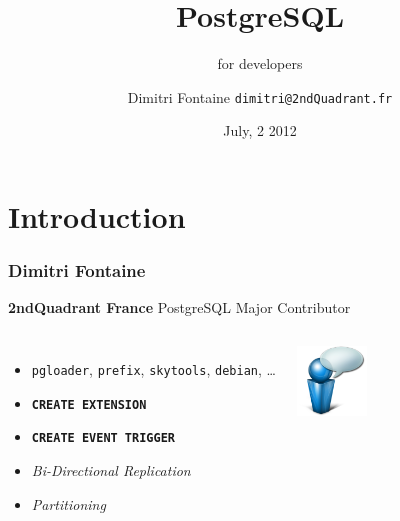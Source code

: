 \documentclass{beamer}
\title{PostgreSQL}
\subtitle{for developers}
\author{Dimitri Fontaine \texttt{dimitri@2ndQuadrant.fr}}
\date{July, 2 2012}
\begin{document}
\frame{\titlepage}

\section{Introduction}

\begin{frame}[fragile]
  \frametitle{Dimitri Fontaine}

  \begin{center}
    \textbf{2ndQuadrant France}
    \linebreak
    PostgreSQL Major Contributor
  \end{center}
  \vfill

\begin{columns}[c]

  \begin{itemize}
   \item<2-> \texttt{pgloader}, \texttt{prefix}, \texttt{skytools}, \texttt{debian}, …
   \item<2-> \texttt{\textbf{CREATE EXTENSION}}
   \item<3-> \texttt{\textbf{CREATE EVENT TRIGGER}}
   \item<3-> \textit{Bi-Directional Replication}
   \item<4-> \textit{Partitioning}
  \end{itemize}  

\begin{center}
  \includegraphics[height=5em]{bulle-blue-icon.png}
\end{center}
\end{columns}
\end{frame}
\end{document}
